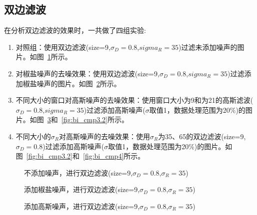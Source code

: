 \documentclass[lang=cn,10pt]{elegantbook}
\begin{document}
\subsection{双边滤波}

在分析双边滤波的效果时，一共做了四组实验:
\vspace{5pt}
\begin{enumerate}[itemsep=1.5ex]

\item 对照组：使用双边滤波(size=9,$\sigma_D=0.8$,$sigma_R=35$)过滤未添加噪声的图片。如图~\ref{fig:bi_cmp1}所示。

\item 对椒盐噪声的去噪效果：使用双边滤波(size=9,$\sigma_D=0.8$,$sigma_R=35$)过滤添加椒盐噪声的图片。如图~\ref{fig:bi_cmp2}所示。

\item 不同大小的窗口对高斯噪声的去噪效果：使用窗口大小为9和为21的高斯滤波($\sigma_D=0.8$,$sigma_R=35$)过滤添加高斯噪声($\sigma$取值1，数据处理范围为20\%)的图片。如图~\ref{fig:bi_cmp3.1}和~\ref{fig:bi_cmp3.2}所示。

\item 不同大小的$\sigma_R$对高斯噪声的去噪效果：使用$\sigma_R$为35、65的双边滤波(size=9,$\sigma_D=0.8$)过滤添加高斯噪声($\sigma$取值1，数据处理范围为20\%)的图片。如图~\ref{fig:bi_cmp3.2}和~\ref{fig:bi_cmp4}所示。

\end{enumerate}

\begin{figure}[htbp]
	\centering
	\caption{不添加噪声，进行双边滤波(size=9,$\sigma_D=0.8$,$\sigma_R=35$)}
	\label{fig:bi_cmp1}
\end{figure}

\begin{figure}[htbp]
	\centering
	\caption{添加椒盐噪声，进行双边滤波(size=9,$\sigma_D=0.8$,$\sigma_R=35$)}
	\label{fig:bi_cmp2}
\end{figure}

\begin{figure}[htbp]
	\centering
	\caption{添加高斯噪声，进行双边滤波(size=9,$\sigma_D=0.8$,$\sigma_R=35$)}
	\label{fig:bi_cmp3.1}
\end{figure}
\end{document}
